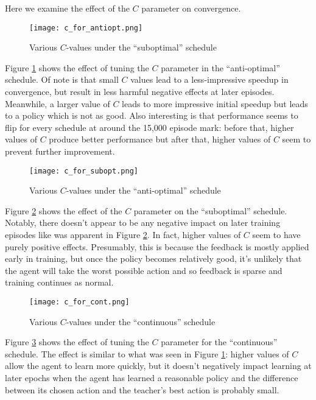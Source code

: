 \documentclass[twocolumn]{article}
\begin{document}
Here we examine the effect of the \(C\) parameter on convergence.

\begin{figure}
\hypertarget{fig:canti}{\centering
\texttt{[image: c\_for\_antiopt.png]}
\caption{Various \(C\)-values under the ``suboptimal''
schedule}\label{fig:canti}
}
\end{figure}

Figure \ref{fig:canti} shows the effect of tuning the \(C\) parameter in
the ``anti-optimal'' schedule. Of note is that small \(C\) values lead
to a less-impressive speedup in convergence, but result in less harmful
negative effects at later episodes. Meanwhile, a larger value of \(C\)
leads to more impressive initial speedup but leads to a policy which is
not as good. Also interesting is that performance seems to flip for
every schedule at around the 15,000 episode mark: before that, higher
values of \(C\) produce better performance but after that, higher values
of \(C\) seem to prevent further improvement.

\begin{figure}
\hypertarget{fig:csub}{\centering
\texttt{[image: c\_for\_subopt.png]}
\caption{Various \(C\)-values under the ``anti-optimal''
schedule}\label{fig:csub}
}
\end{figure}

Figure \ref{fig:csub} shows the effect of the \(C\) parameter on the
``suboptimal'' schedule. Notably, there doesn't appear to be any
negative impact on later training episodes like was apparent in Figure
\ref{fig:csub}. In fact, higher values of \(C\) seem to have purely
positive effects. Presumably, this is because the feedback is mostly
applied early in training, but once the policy becomes relatively good,
it's unlikely that the agent will take the worst possible action and so
feedback is sparse and training continues as normal.

\begin{figure}
\hypertarget{fig:ccont}{\centering
\texttt{[image: c\_for\_cont.png]}
\caption{Various \(C\)-values under the ``continuous''
schedule}\label{fig:ccont}
}
\end{figure}

Figure \ref{fig:ccont} shows the effect of tuning the \(C\) parameter
for the ``continuous'' schedule. The effect is similar to what was seen
in Figure \ref{fig:canti}: higher values of \(C\) allow the agent to
learn more quickly, but it doesn't negatively impact learning at later
epochs when the agent has learned a reasonable policy and the difference
between its chosen action and the teacher's best action is probably
small.
\end{document}

